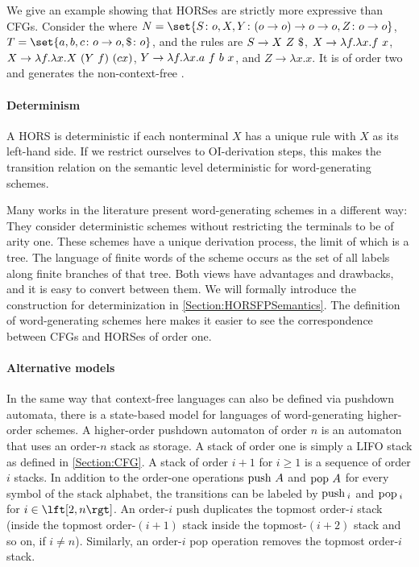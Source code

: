 \documentclass[../../diss.tex]{subfiles}
\begin{document}
\begin{example}
    We give an example showing that HORSes are strictly more expressive than CFGs.
    Consider the  where
    $N = \set{S \colon \ground, X, Y \colon (\ground \to \ground) \to \ground \to \ground, Z \colon \ground \to \ground}$,
    $T = \set{a, b, c \colon \ground \to \ground, \wordend \colon \ground}$,
    and the rules are $S \to X \appl Z \appl \wordend$, $X \to \lambda f. \lambda x . f \  x$, $X \to \lambda f. \lambda x . X \  (Y \  f) \  (c x)$, $Y \to \lambda f.\lambda x . a \  f \  b \  x$, and $Z \to \lambda x . x$.
    It is of order two and generates the non-context-free .
\end{example}

\paragraph{Determinism}

A HORS is deterministic if each nonterminal $X$ has a unique rule with $X$ as its left-hand side.
If we restrict ourselves to OI-derivation steps, this makes the transition relation on the semantic level deterministic for word-generating schemes.

Many works in the literature present word-generating schemes in a different way:
They consider deterministic schemes without restricting the terminals to be of arity one.
These schemes have a unique derivation process, the limit of which is a tree.
The language of finite words of the scheme occurs as the set of all labels along finite branches of that tree.
Both views have advantages and drawbacks, and it is easy to convert between them.
We will formally introduce the construction for determinization in \cref{Section:HORSFPSemantics}.
The definition of word-generating schemes here makes it easier to see the correspondence between CFGs and HORSes of order one.

\paragraph{Alternative models}

In the same way that context-free languages can also be defined via pushdown automata, there is a state-based model for languages of word-generating higher-order schemes.
A higher-order pushdown automaton of order $n$ is an automaton that uses an order-$n$ stack as storage. A stack of order one is simply a LIFO stack as defined in \cref{Section:CFG}.
A stack of order $i+1$ for $i \geq 1$ is a sequence of order $i$ stacks.
In addition to the order-one operations $\text{push}~ A$ and $\text{pop}~ A$ for every symbol of the stack alphabet, the transitions can be labeled by $\text{push}~_{\!i}$ and $\text{pop}~_{\!i}$ for $i \in \fromto{2}{n}$.
An order-$i$ push duplicates the topmost order-$i$ stack (inside the topmost order-$(i+1)$ stack inside the topmost-$(i+2)$ stack and so on, if $i \neq n$).
Similarly, an order-$i$ pop operation removes the topmost order-$i$ stack.
\end{document}
